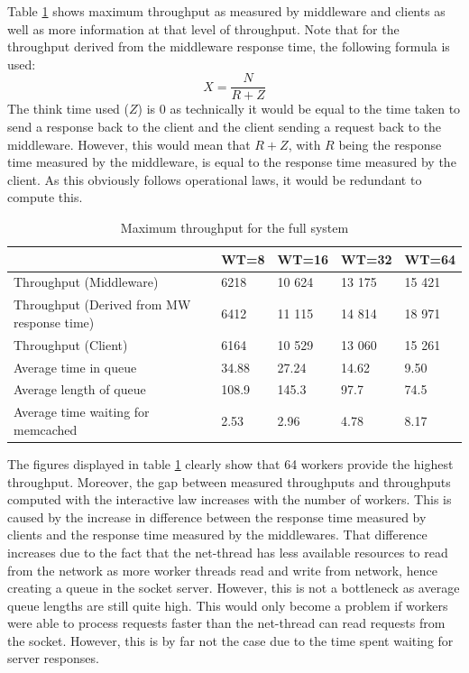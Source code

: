 \documentclass[11pt,a4paper]{article}
\begin{document}
Table \ref{table::max_through_section_4} shows maximum throughput as measured by middleware and clients as well as more information at that level of throughput. Note that for the throughput derived from the middleware response time, the following formula is used:
$$
X = \frac{N}{R + Z}
$$
The think time used ($Z$) is 0 as technically it would be equal to the time taken to send a response back to the client and the client sending a request back to the middleware. However, this would mean that $R + Z$, with $R$ being the response time measured by the middleware, is equal to the response time measured by the client. As this obviously follows operational laws, it would be redundant to compute this.

\begin{table}[!h]
    \centering
    \begin{tabular}{|l|p{1.5cm}|p{1.5cm}|p{1.5cm}|p{1.5cm}|}
        \hline                                            &   WT=8 &   WT=16 &   WT=32 &   WT=64 \\
        \hline Throughput (Middleware)                    &   6218 &  10 624 &  13 175 &  15 421 \\
        \hline Throughput (Derived from MW response time) &   6412 &  11 115 &  14 814 &  18 971 \\
        \hline Throughput (Client)                        &   6164 &  10 529 &  13 060 &  15 261 \\
        \hline Average time in queue                      &  34.88 &   27.24 &   14.62 &    9.50 \\
        \hline Average length of queue                    &  108.9 &   145.3 &    97.7 &    74.5 \\
        \hline Average time waiting for memcached         &   2.53 &    2.96 &    4.78 &    8.17 \\
        \hline
    \end{tabular}
    \caption{Maximum throughput for the full system}
    \label{table::max_through_section_4}
\end{table}

The figures displayed in table \ref{table::max_through_section_4} clearly show that 64 workers provide the highest throughput. Moreover, the gap between measured throughputs and throughputs computed with the interactive law increases with the number of workers. This is caused by the increase in difference between the response time measured by clients and the response time measured by the middlewares. That difference increases due to the fact that the net-thread has less available resources to read from the network as more worker threads read and write from network, hence creating a queue in the socket server. However, this is not a bottleneck as average queue lengths are still quite high. This would only become a problem if workers were able to process requests faster than the net-thread can read requests from the socket. However, this is by far not the case due to the time spent waiting for server responses.
\end{document}
